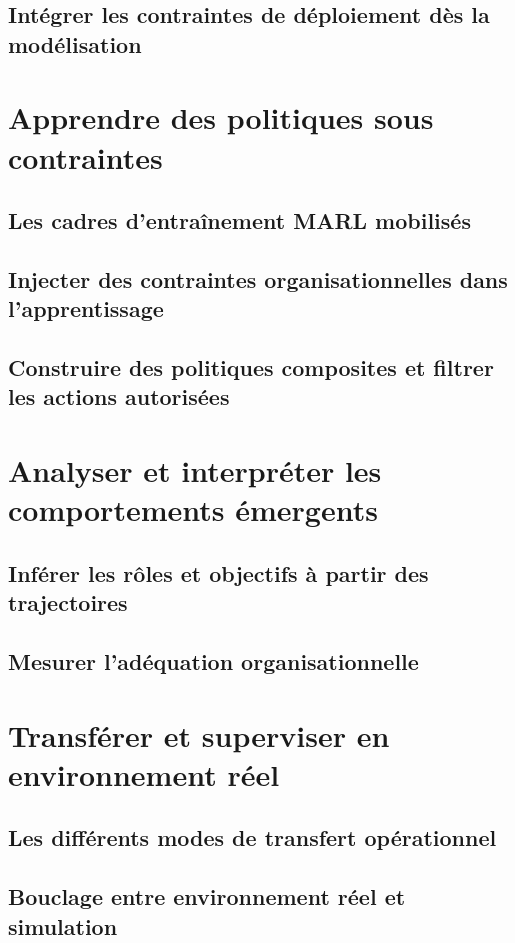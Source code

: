 \documentclass[ twoside,openright,titlepage,numbers=noenddot,headinclude,%
                footinclude=true,cleardoublepage=empty,abstractoff, %
                BCOR=5mm,paper=a4,fontsize=11pt,%
                french,american,%
                ]{scrreprt}
\begin{document}
\section{Intégrer les contraintes de déploiement dès la modélisation}

\chapter{Apprendre des politiques sous contraintes}
\section{Les cadres d'entraînement MARL mobilisés}
\section{Injecter des contraintes organisationnelles dans l'apprentissage}
\section{Construire des politiques composites et filtrer les actions autorisées}

\chapter{Analyser et interpréter les comportements émergents}
\section{Inférer les rôles et objectifs à partir des trajectoires}
\section{Mesurer l'adéquation organisationnelle}

\chapter{Transférer et superviser en environnement réel}
\section{Les différents modes de transfert opérationnel}
\section{Bouclage entre environnement réel et simulation}
\end{document}

